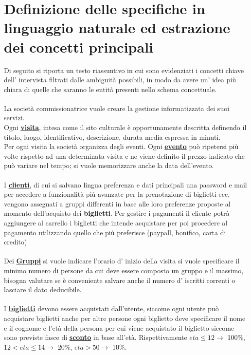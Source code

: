 \documentclass[a4paper,12pt]{report}
\begin{document}
\section{Definizione delle specifiche in linguaggio naturale ed estrazione dei concetti principali}
Di seguito si riporta un testo riassuntivo in cui sono evidenziati i concetti chiave
dell’ intervista filtrati dalle ambiguità possibili, in modo da avere un’ idea più chiara di
quelle che saranno le entità presenti nello schema concettuale.\\\\
La società commissionatrice vuole creare la gestione informatizzata dei suoi servizi.\\
Ogni \textbf{\underline{visita}}, intesa come il sito culturale è opportunamente descritta definendo
il titolo, luogo, identificativo, descrizione, durata media espressa in minuti.\\
Per ogni visita la società organizza degli eventi. Ogni \textbf{\underline{evento}} può ripetersi più volte
rispetto ad una determinata visita e ne viene definito il prezzo indicato che può variare nel tempo; si vuole memorizzare anche
la data dell'evento.\\\\
I \textbf{\underline{clienti}}, di cui si salvano lingua preferenza e dati principali una password e mail per accedere a funzionalità
più avanzate per la prenotazione di biglietti ecc, vengono assegnati a gruppi differenti in base alle loro preferenze
proposte  al momento dell'acquisto dei \textbf{biglietti}. Per gestire i pagamenti il cliente potrà aggiungere al carrello i biglietti che intende
acquistare per poi procedere al pagamento utilizzando quello che più preferisce (paypall, bonifico, carta di credito) \\\\
Dei \textbf{\underline{Gruppi}} si vuole indicare l'orario d' inizio della visita si vuole specificare
il minimo numero di persone da cui deve essere composto un gruppo e il massimo, bisogna valutare
se è conveniente salvare anche il numero d' iscritti correnti o lasciare il dato deducibile.\\\\
I \textbf{\underline{biglietti}} devono essere acquistati dall'utente, siccome ogni utente può acquistare biglietti anche per altre persone
ogni biglietto deve specificare il nome e il cognome e l'età della persona per cui
viene acquistato il biglietto siccome sono previste fasce di \textbf{\underline{sconto}} in base all'età.
Rispettivamente \(eta \le 12 \rightarrow\)  100\%, \(12 < eta \le 14 \rightarrow\)  20\%, \(eta >50 \rightarrow\)  10\%.
\end{document}
